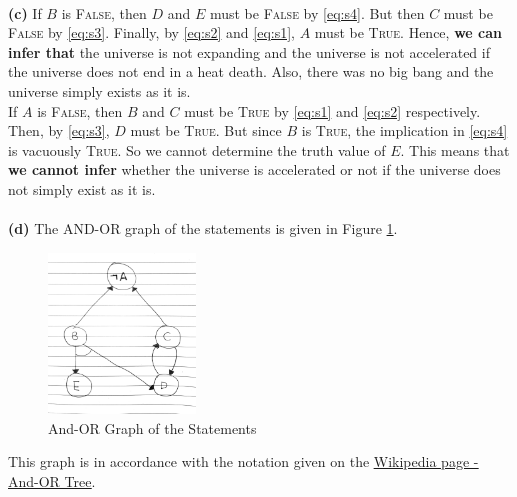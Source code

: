 \documentclass[12pt]{article}
\begin{document}
    \vspace*{0pt} \\
    \textbf{(c)}
    If $B$ is \textsc{False}, then $D$ and $E$ must be \textsc{False} by \eqref{eq:s4}. But then $C$ must be \textsc{False}
    by \eqref{eq:s3}. Finally, by \eqref{eq:s2} and \eqref{eq:s1}, $A$ must be \textsc{True}. Hence, \textbf{we can infer that}
    the universe is not expanding and the universe is not accelerated if the universe does not end in a heat death. Also, there
    was no big bang and the universe simply exists as it is. \\
    If $A$ is \textsc{False}, then $B$ and $C$ must be \textsc{True} by \eqref{eq:s1} and \eqref{eq:s2} respectively. Then,
    by \eqref{eq:s3}, $D$ must be \textsc{True}. But since $B$ is \textsc{True}, the implication in \eqref{eq:s4} is vacuously
    \textsc{True}. So we cannot determine the truth value of $E$. This means that \textbf{we cannot infer} whether the universe
    is accelerated or not if the universe does not simply exist as it is. \\
    \vspace*{0pt} \\
    \textbf{(d)}
    The AND-OR graph of the statements is given in Figure \ref{fig:and-or}.
    \begin{figure}[htpb]
        \centering
        \includegraphics[width=0.35\textwidth]{Assets/and-or.jpg}
        \caption{And-OR Graph of the Statements}
        \label{fig:and-or}
    \end{figure}
    This graph is in accordance with the notation given on the
    \href{https://en.wikipedia.org/wiki/And%E2%80%93or_tree}{\underline{Wikipedia page - And-OR Tree}}.
\end{document}
